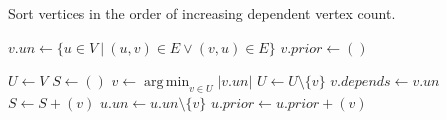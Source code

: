 \documentclass{article}
\newcommand{\set}[1]{\{#1\}}
\DeclareMathOperator*{\argmin}{arg\,min}
\begin{document}
\begin{algorithm}
	\caption{\label{alg:sort}Sort vertices in the order of increasing dependent
	vertex count.}

\begin{algorithmic}[1]

	\State $v.un \leftarrow \set{u\in V~|~(u,v)\in E \lor (v,u)\in E}$
	\State $v.prior \gets ()$
	\EndFor
	\Statex

	\State $U\gets V$
	\State $S \gets ()$ 
		\State $v \gets \argmin_{v \in U} |v.un|$
		\State $U \gets U \setminus \set{v}$
		\State $v.depends \gets v.un$
		\State $S \gets S + (v)$ 
			\State $u.un \gets u.un \setminus \set{v}$
				\State $u.prior \gets u.prior + (v)$
			\EndIf
		\EndFor
	\EndWhile

	\State {}
	\EndProcedure
\end{algorithmic}
\end{algorithm}
\end{document}
